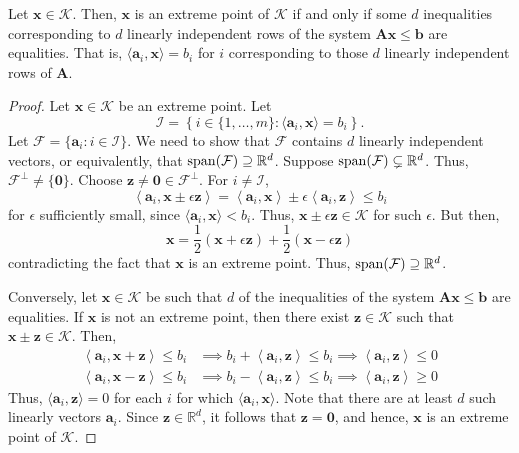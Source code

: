\begin{thm}
    Let $\mathbf{x} \in \mathcal{K}$. Then, $\mathbf{x}$ is an extreme point of $\mathcal{K}$ if and only if some $d$ inequalities corresponding to $d$ linearly independent rows of the system $\mathbf{Ax} \leq \mathbf{b}$ are equalities. That is, $\langle \mathbf{a}_i, \mathbf{x} \rangle = b_i$ for $i$ corresponding to those $d$ linearly independent rows of $\mathbf{A}$.
\end{thm}
\begin{proof}
    Let $\mathbf{x} \in \mathcal{K}$ be an extreme point. Let
    \[
        \mathcal{I} = \left\{ i \in \{1, \ldots, m \} \colon \langle \mathbf{a}_i, \mathbf{x} \rangle = b_i \right\}.
    \]
    Let $\mathcal{F} = \{ \mathbf{a}_i \colon i \in \mathcal{I} \}$. We need to show that $\mathcal{F}$ contains $d$ linearly independent vectors, or equivalently, that $\operatorname*{span} (\mathcal{F}) \supseteq \mathbb{R}^d$. Suppose $\operatorname*{span}(\mathcal{F}) \subsetneq \mathbb{R}^d$. Thus, $\mathcal{F}^{\perp} \neq \{\mathbf{0}\}$. Choose $\mathbf{z} \neq \mathbf{0} \in \mathcal{F}^{\perp}$. For $i \neq \mathcal{I}$, 
    \[
        \left\langle \mathbf{a}_i, \mathbf{x} \pm \epsilon \mathbf{z} \right\rangle = \left\langle \mathbf{a}_i, \mathbf{x} \right\rangle \pm \epsilon \left\langle \mathbf{a}_i, \mathbf{z} \right\rangle \leq b_i
    \]
    for $\epsilon$ sufficiently small, since $\langle \mathbf{a}_i, \mathbf{x} \rangle < b_i$. Thus, $\mathbf{x} \pm \epsilon \mathbf{z} \in \mathcal{K}$ for such $\epsilon$. But then,
    \[
        \mathbf{x} = \frac{1}{2} (\mathbf{x} + \epsilon\mathbf{z}) + \frac{1}{2} (\mathbf{x} - \epsilon\mathbf{z})
    \]
    contradicting the fact that $\mathbf{x}$ is an extreme point. Thus, $\operatorname*{span}(\mathcal{F}) \supseteq \mathbb{R}^d$. 

    Conversely, let $\mathbf{x} \in \mathcal{K}$ be such that $d$ of the inequalities of the system $\mathbf{Ax} \leq \mathbf{b}$ are equalities. If $\mathbf{x}$ is not an extreme point, then there exist $\mathbf{z} \in \mathcal{K}$ such that $\mathbf{x} \pm \mathbf{z} \in \mathcal{K}$. Then,
    \begin{align*}
        \left\langle \mathbf{a}_i, \mathbf{x} + \mathbf{z} \right\rangle \leq b_i &\implies b_i + \left\langle \mathbf{a}_i, \mathbf{z} \right\rangle \leq b_i \implies \left\langle \mathbf{a}_i, \mathbf{z} \right\rangle \leq 0 \\
        \left\langle \mathbf{a}_i, \mathbf{x} - \mathbf{z} \right\rangle \leq b_i &\implies b_i - \left\langle \mathbf{a}_i, \mathbf{z} \right\rangle \leq b_i \implies \left\langle \mathbf{a}_i, \mathbf{z} \right\rangle \geq 0
    \end{align*}
    Thus, $\langle \mathbf{a}_i, \mathbf{z} \rangle = 0$ for each $i$ for which $\langle \mathbf{a}_i, \mathbf{x} \rangle$. Note that there are at least $d$ such linearly vectors $\mathbf{a}_i$. Since $\mathbf{z} \in \mathbb{R}^d$, it follows that $\mathbf{z} = \mathbf{0}$, and hence, $\mathbf{x}$ is an extreme point of $\mathcal{K}$.
\end{proof}

